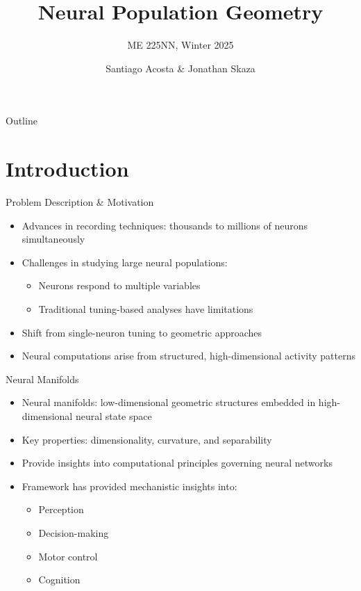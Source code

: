 \documentclass[aspectratio=169]{beamer}
\title[Neural Population Geometry]{Neural Population Geometry}
\subtitle{ME 225NN, Winter 2025}
\author[Acosta \& Skaza]{Santiago Acosta \& Jonathan Skaza}
\institute[UCSB]{Dynamical Neuroscience Graduate Program\\University of California, Santa Barbara}
\date{}
\begin{document}
\begin{frame}
    \titlepage
\end{frame}

\begin{frame}{Outline}
    \tableofcontents
\end{frame}

\section{Introduction}

\begin{frame}{Problem Description \& Motivation}
    \begin{itemize}
        \item Advances in recording techniques: thousands to millions of neurons simultaneously
        \item Challenges in studying large neural populations:
        \begin{itemize}
            \item Neurons respond to multiple variables
            \item Traditional tuning-based analyses have limitations
        \end{itemize}
        \item Shift from single-neuron tuning to geometric approaches
        \item Neural computations arise from structured, high-dimensional activity patterns
    \end{itemize}
\end{frame}

\begin{frame}{Neural Manifolds}
    \begin{itemize}
        \item Neural manifolds: low-dimensional geometric structures embedded in high-dimensional neural state space
        \item Key properties: dimensionality, curvature, and separability
        \item Provide insights into computational principles governing neural networks
        \item Framework has provided mechanistic insights into:
        \begin{itemize}
            \item Perception
            \item Decision-making
            \item Motor control
            \item Cognition
        \end{itemize}
    \end{itemize}
\end{frame}
\end{document}
